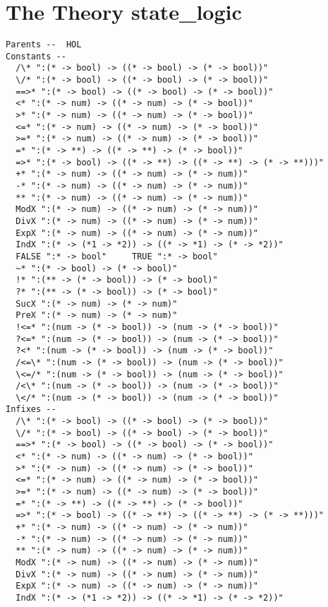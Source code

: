 {\footnotesize
\section*{The Theory state\_logic}

\begin{verbatim}
Parents --  HOL     
Constants --
  /\* ":(* -> bool) -> ((* -> bool) -> (* -> bool))"
  \/* ":(* -> bool) -> ((* -> bool) -> (* -> bool))"
  ==>* ":(* -> bool) -> ((* -> bool) -> (* -> bool))"
  <* ":(* -> num) -> ((* -> num) -> (* -> bool))"
  >* ":(* -> num) -> ((* -> num) -> (* -> bool))"
  <=* ":(* -> num) -> ((* -> num) -> (* -> bool))"
  >=* ":(* -> num) -> ((* -> num) -> (* -> bool))"
  =* ":(* -> **) -> ((* -> **) -> (* -> bool))"
  =>* ":(* -> bool) -> ((* -> **) -> ((* -> **) -> (* -> **)))"
  +* ":(* -> num) -> ((* -> num) -> (* -> num))"
  -* ":(* -> num) -> ((* -> num) -> (* -> num))"
  ** ":(* -> num) -> ((* -> num) -> (* -> num))"
  ModX ":(* -> num) -> ((* -> num) -> (* -> num))"
  DivX ":(* -> num) -> ((* -> num) -> (* -> num))"
  ExpX ":(* -> num) -> ((* -> num) -> (* -> num))"
  IndX ":(* -> (*1 -> *2)) -> ((* -> *1) -> (* -> *2))"
  FALSE ":* -> bool"     TRUE ":* -> bool"
  ~* ":(* -> bool) -> (* -> bool)"
  !* ":(** -> (* -> bool)) -> (* -> bool)"
  ?* ":(** -> (* -> bool)) -> (* -> bool)"
  SucX ":(* -> num) -> (* -> num)"
  PreX ":(* -> num) -> (* -> num)"
  !<=* ":(num -> (* -> bool)) -> (num -> (* -> bool))"
  ?<=* ":(num -> (* -> bool)) -> (num -> (* -> bool))"
  ?<* ":(num -> (* -> bool)) -> (num -> (* -> bool))"
  /<=\* ":(num -> (* -> bool)) -> (num -> (* -> bool))"
  \<=/* ":(num -> (* -> bool)) -> (num -> (* -> bool))"
  /<\* ":(num -> (* -> bool)) -> (num -> (* -> bool))"
  \</* ":(num -> (* -> bool)) -> (num -> (* -> bool))"     
Infixes --
  /\* ":(* -> bool) -> ((* -> bool) -> (* -> bool))"
  \/* ":(* -> bool) -> ((* -> bool) -> (* -> bool))"
  ==>* ":(* -> bool) -> ((* -> bool) -> (* -> bool))"
  <* ":(* -> num) -> ((* -> num) -> (* -> bool))"
  >* ":(* -> num) -> ((* -> num) -> (* -> bool))"
  <=* ":(* -> num) -> ((* -> num) -> (* -> bool))"
  >=* ":(* -> num) -> ((* -> num) -> (* -> bool))"
  =* ":(* -> **) -> ((* -> **) -> (* -> bool))"
  =>* ":(* -> bool) -> ((* -> **) -> ((* -> **) -> (* -> **)))"
  +* ":(* -> num) -> ((* -> num) -> (* -> num))"
  -* ":(* -> num) -> ((* -> num) -> (* -> num))"
  ** ":(* -> num) -> ((* -> num) -> (* -> num))"
  ModX ":(* -> num) -> ((* -> num) -> (* -> num))"
  DivX ":(* -> num) -> ((* -> num) -> (* -> num))"
  ExpX ":(* -> num) -> ((* -> num) -> (* -> num))"
  IndX ":(* -> (*1 -> *2)) -> ((* -> *1) -> (* -> *2))"     

\end{verbatim}}

